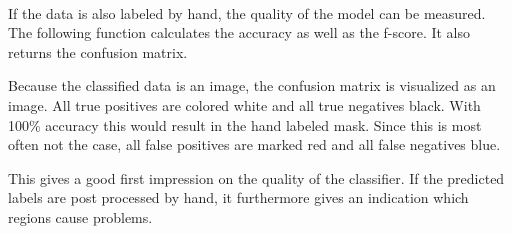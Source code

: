     \begin{center}
    \end{center}
    { \hspace*{\fill} \\}
    
    If the data is also labeled by hand, the quality of the model can be
measured. The following function calculates the accuracy as well as the
f-score. It also returns the confusion matrix.

Because the classified data is an image, the confusion matrix is
visualized as an image. All true positives are colored white and all
true negatives black. With 100\% accuracy this would result in the hand
labeled mask. Since this is most often not the case, all false positives
are marked red and all false negatives blue.

This gives a good first impression on the quality of the classifier. If
the predicted labels are post processed by hand, it furthermore gives an
indication which regions cause problems.


